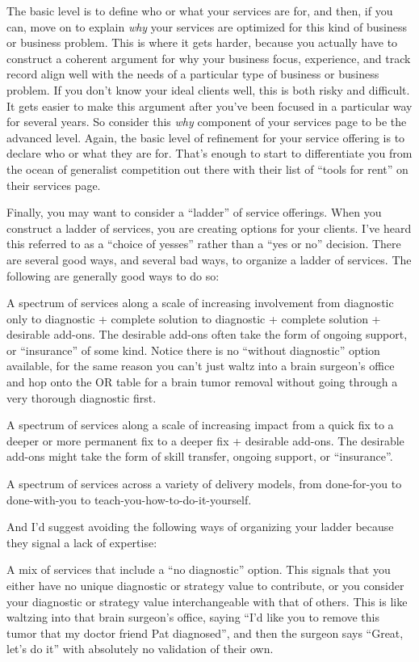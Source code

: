 The basic level is to define who or what your services are for, and then, if you can, move on to explain \emph{why} your services are optimized for this kind of business or business problem. This is where it gets harder, because you actually have to construct a coherent argument for why your business focus, experience, and track record align well with the needs of a particular type of business or business problem. If you don't know your ideal clients well, this is both risky and difficult. It gets easier to make this argument after you've been focused in a particular way for several years. So consider this \emph{why} component of your services page to be the advanced level. Again, the basic level of refinement for your service offering is to declare who or what they are for. That's enough to start to differentiate you from the ocean of generalist competition out there with their list of ``tools for rent'' on their services page.

Finally, you may want to consider a ``ladder'' of service offerings. When you construct a ladder of services, you are creating options for your clients. I've heard this referred to as a ``choice of yesses'' rather than a ``yes or no'' decision. There are several good ways, and several bad ways, to organize a ladder of services. The following are generally good ways to do so:

A spectrum of services along a scale of increasing involvement from diagnostic only to diagnostic + complete solution to diagnostic + complete solution + desirable add-ons. The desirable add-ons often take the form of ongoing support, or ``insurance'' of some kind. Notice there is no ``without diagnostic'' option available, for the same reason you can't just waltz into a brain surgeon's office and hop onto the OR table for a brain tumor removal without going through a very thorough diagnostic first.

A spectrum of services along a scale of increasing impact from a quick fix to a deeper or more permanent fix to a deeper fix + desirable add-ons. The desirable add-ons might take the form of skill transfer, ongoing support, or ``insurance''.

A spectrum of services across a variety of delivery models, from done-for-you to done-with-you to teach-you-how-to-do-it-yourself.

And I'd suggest avoiding the following ways of organizing your ladder because they signal a lack of expertise:

A mix of services that include a ``no diagnostic'' option. This signals that you either have no unique diagnostic or strategy value to contribute, or you consider your diagnostic or strategy value interchangeable with that of others. This is like waltzing into that brain surgeon's office, saying ``I'd like you to remove this tumor that my doctor friend Pat diagnosed'', and then the surgeon says ``Great, let's do it'' with absolutely no validation of their own.

